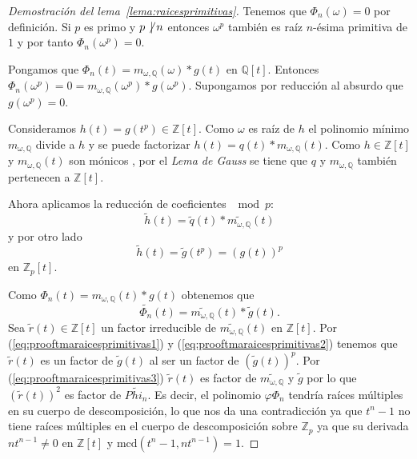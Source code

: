 \documentclass[10pt, spanish]{report}
\theoremstyle{definition}
\theoremstyle{custom}
\theoremstyle{remark}
\newcommand{\Z}{\mathbb{Z}}
\newcommand{\Q}{\mathbb{Q}}
\newcommand{\mcd}[1]{\text{mcd}(#1)}
\begin{document}
\begin{proof}[Demostración del lema~\ref{lema:raicesprimitivas}]
    Tenemos que $\Phi_n(\omega)=0$ por definición. Si $p$ es primo y $p\not\,\mid
    n$ entonces $\omega^p$ también es raíz $n$-ésima primitiva de $1$ y por
    tanto $\Phi_n(\omega^p)=0$.

    Pongamos que $\Phi_n(t)=m_{\omega,\Q}(\omega)*g(t)$ en $\Q[t]$. Entonces
    $\Phi_n(\omega^p)=0=m_{\omega,\Q}(\omega^p)*g(\omega^p)$. Supongamos por
    reducción al absurdo que $g(\omega^p)=0$.

    Consideramos $h(t)=g(t^p)\in\Z[t]$. Como $\omega$ es raíz de $h$ el
    polinomio mínimo $m_{\omega,\Q}$ divide a $h$ y se puede factorizar
    $h(t)=q(t)*m_{\omega,\Q}(t)$. Como $h\in\Z[t]$ y $m_{\omega,\Q}(t)$ son
    mónicos , por el \textit{Lema de Gauss} se tiene que $q$ y $m_{\omega,\Q}$
    también pertenecen a $\Z[t]$.

    Ahora aplicamos la reducción de coeficientes $\mod p$:
    \begin{equation}\tag{1}\label{eq:prooftmaraicesprimitivas1}
        \tilde{h}(t)=\tilde{q}(t)*\tilde{m_{\omega,\Q}}(t)
    \end{equation}
    y por otro lado 
    \begin{equation}\tag{2}\label{eq:prooftmaraicesprimitivas2}
        \tilde{h}(t)=\tilde{g}(t^p)=(g(t))^p 
    \end{equation}
    en $\Z_p[t]$.

    Como $\Phi_n(t)=m_{\omega,\Q}(t)*g(t)$ obtenemos que
    \begin{equation}\tag{3}\label{eq:prooftmaraicesprimitivas3}
        \tilde{\Phi_n}(t)=\tilde{m_{\omega,\Q}}(t)*\tilde{g}(t).
    \end{equation}
    Sea $\tilde{r}(t)\in\Z[t]$ un factor irreducible de
    $\tilde{m_{\omega,\Q}}(t)$ en $\Z[t]$. Por
    (\ref{eq:prooftmaraicesprimitivas1}) y (\ref{eq:prooftmaraicesprimitivas2})
    tenemos que $\tilde{r}(t)$ es un factor de $\tilde{g}(t)$ al ser un factor
    de $(\tilde{g}(t))^p$. Por (\ref{eq:prooftmaraicesprimitivas3})
    $\tilde{r}(t)$ es factor de $\tilde{m_{\omega,\Q}}$ y $\tilde{g}$ por lo que
    $(\tilde{r}(t))^2$ es factor de $\tilde{Phi_n}$. Es decir, el polinomio
    $\varphi{\Phi_n}$ tendría raíces múltiples en su cuerpo de descomposición,
    lo que nos da una contradicción ya que $t^n-1$ no tiene raíces múltiples en
    el cuerpo de descomposición sobre $\Z_p$ ya que su derivada $nt^{n-1}\neq 0$
    en $\Z[t]$ y $\mcd{t^n-1, nt^{n-1}}=1$.    
\end{proof}
\end{document}
